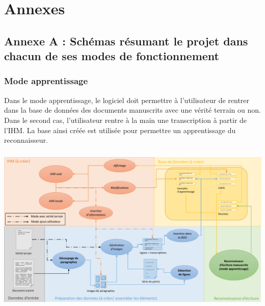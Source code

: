 \chapter{Annexes}

\section{Annexe A : Schémas résumant le projet dans chacun de ses modes de fonctionnement}

\subsection{Mode apprentissage}

Dans le mode apprentissage, le logiciel doit permettre à l’utilisateur de rentrer dans la
base de données des documents manuscrits avec une vérité terrain ou non. Dans le second cas,
l’utilisateur rentre à la main une transcription à partir de l’IHM. La base ainsi créée est
utilisée pour permettre un apprentissage du reconnaisseur.

\paragraph{}
\begin{mdframed}[frametitle={Annexe A.1.1 : Avec détection de lignes}, innerbottommargin=10]
\begin{center}
\includegraphics[width=\linewidth]{schema_mode1.1.pdf}
\end{center}
\end{mdframed}

\newpage

